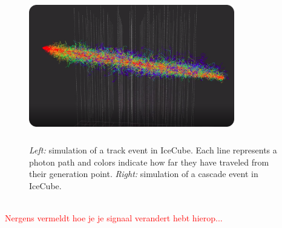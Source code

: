 \begin{figure}
\centering
\includegraphics[width=0.8\textwidth,height=2.6in]{chapter6/img/photons_track_rounded.png}
\caption{\textit{Left:} simulation of a track event in IceCube. Each line represents a photon path and colors indicate how far they have traveled from their generation point. \textit{Right:} simulation of a cascade event in IceCube.}
\label{fig:photonsimulation}
\end{figure}

\textcolor{red}{\\Nergens vermeldt hoe je je signaal verandert hebt hierop...\\}

